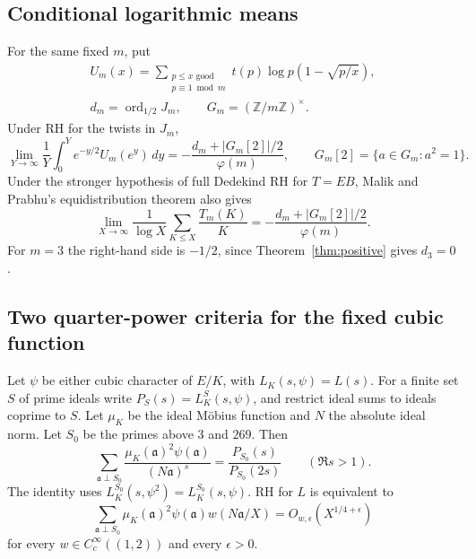\documentclass[11pt]{article}
\newcommand{\Z}{\mathbb Z}
\newcommand{\ord}{\operatorname{ord}}
\begin{document}
\subsection*{Conditional logarithmic means}
For the same fixed $m$, put
\[
 \begin{gathered}
 U_m(x)=\sum_{\substack{p\le x\text{ good}\\p\equiv1\bmod m}}
        t(p)\log p(1-\sqrt{p/x}),\\
 d_m=\ord_{1/2}J_m,
 \qquad G_m=(\Z/m\Z)^\times.
 \end{gathered}
\]
Under RH for the twists in $J_m$,
\[
 \lim_{Y\to\infty}\frac1Y\int_0^Y e^{-y/2}U_m(e^y)\,dy
       =-\frac{d_m+|G_m[2]|/2}{\varphi(m)},
 \qquad G_m[2]=\{a\in G_m:a^2=1\}.
\]
Under the stronger hypothesis of full Dedekind RH for $T=EB$,
Malik and Prabhu's equidistribution theorem also gives
\[
 \lim_{X\to\infty}\frac1{\log X}\sum_{K\le X}\frac{T_m(K)}K
       =-\frac{d_m+|G_m[2]|/2}{\varphi(m)}.
\]
For $m=3$ the right-hand side is $-1/2$, since
Theorem~\ref{thm:positive} gives $d_3=0$.

\subsection*{Two quarter-power criteria for the fixed cubic function}
Let $\psi$ be either cubic character of $E/K$, with
$L_K(s,\psi)=L(s)$. For a finite set $S$ of prime ideals write
$P_S(s)=L_K^S(s,\psi)$, and restrict ideal sums to ideals coprime
to $S$. Let $\mu_K$ be the ideal M\"obius function and $N$ the
absolute ideal norm. Let $S_0$ be the primes above $3$ and $269$. Then
\[
 \sum_{\mathfrak a\perp S_0}
       \frac{\mu_K(\mathfrak a)^2\psi(\mathfrak a)}{(N\mathfrak a)^s}
        =\frac{P_{S_0}(s)}{P_{S_0}(2s)}\qquad(\Re s>1).
\]
The identity uses $L_K^{S_0}(s,\psi^2)=L_K^{S_0}(s,\psi)$.
RH for $L$ is equivalent to
\[
 \sum_{\mathfrak a\perp S_0}\mu_K(\mathfrak a)^2\psi(\mathfrak a)
       w(N\mathfrak a/X)=O_{w,\epsilon}(X^{1/4+\epsilon})
\]
for every $w\in C_c^\infty((1,2))$ and every $\epsilon>0$.
\end{document}
